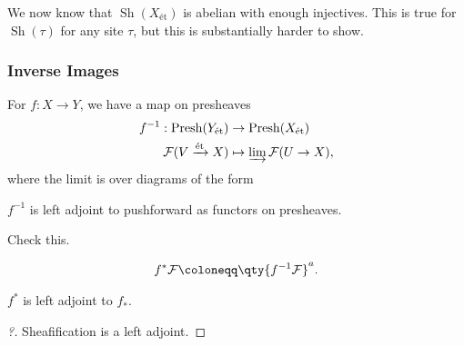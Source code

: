 \begin{remark}

We now know that \({\operatorname{Sh}}(X_\text{ét})\) is abelian with
enough injectives. This is true for \({\operatorname{Sh}}(\tau)\) for
any site \(\tau\), but this is substantially harder to show.

\end{remark}

\hypertarget{inverse-images}{%
\subsubsection{Inverse Images}\label{inverse-images}}

For \(f:X\to Y\), we have a map on presheaves
\begin{align*}  
f^{-1} :{\operatorname{Presh}}(Y_{\text{ét}}) &\to {\operatorname{Presh}}(X_\text{ét}) \\
\mathcal{F}(V\xrightarrow{\text{ét}} X) &\mapsto \varinjlim\mathcal{F}(U\to X)
,\end{align*}
where the limit is over diagrams of the form

\begin{fact}

\(f^{-1}\) is left adjoint to pushforward as functors on presheaves.

\end{fact}

\begin{exercise}[?]

Check this.

\end{exercise}

\begin{definition}

\begin{align*}  
f^* \mathcal{F} \coloneqq\qty{f^{-1} \mathcal{F}}^a
.\end{align*}

\end{definition}

\begin{theorem}[?]

\(f^*\) is left adjoint to \(f_*\).

\end{theorem}

\begin{proof}[?]

Sheafification is a left adjoint.

\end{proof}

